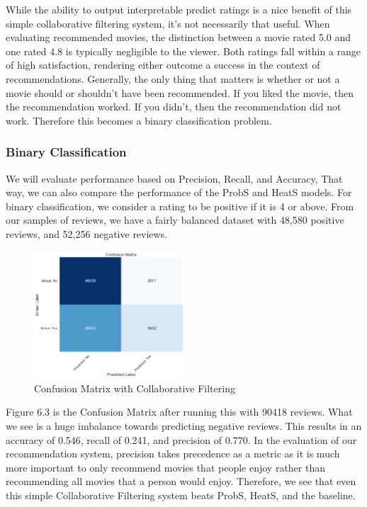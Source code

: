 \documentclass[12pt]{article}
\numberwithin{equation}{section}
\begin{document}
While the ability to output interpretable predict ratings is a nice benefit of this simple collaborative filtering system, it's not necessarily that useful. When evaluating recommended movies, the distinction between a movie rated 5.0 and one rated 4.8 is typically negligible to the viewer. Both ratings fall within a range of high satisfaction, rendering either outcome a success in the context of recommendations. Generally, the only thing that matters is whether or not a movie should or shouldn't have been recommended. If you liked the movie, then the recommendation worked. If you didn't, then the recommendation did not work. Therefore this becomes a binary classification problem.

\subsubsection{Binary Classification}

We will evaluate performance based on Precision, Recall, and Accuracy, That way, we can also compare the performance of the ProbS and HeatS models. For binary classification, we consider a rating to be positive if it is 4 or above. From our samples of reviews, we have a fairly balanced dataset with 48,580 positive reviews, and 52,256 negative reviews.

\begin{figure}[t]
  \centering
  \includegraphics[width=0.5\textwidth]{conf_mat.png}
  \caption{Confusion Matrix with Collaborative Filtering}
  \label{fig:UN_degreeinfo}
\end{figure}

Figure 6.3 is the Confusion Matrix after running this with 90418 reviews. What we see is a huge imbalance towards predicting negative reviews. This results in an accuracy of 0.546, recall of 0.241, and precision of 0.770. In the evaluation of our recommendation system, precision takes precedence as a metric as it is much more important to only recommend movies that people enjoy rather than recommending all movies that a person would enjoy. Therefore, we see that even this simple Collaborative Filtering system beats ProbS, HeatS, and the baseline.
\end{document}
